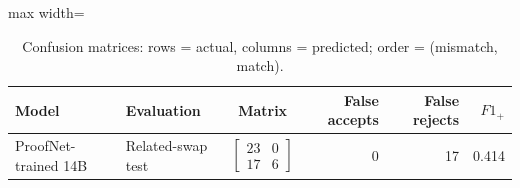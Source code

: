 \begin{table}[htbp]
\centering
\caption{Confusion matrices: rows = actual, columns = predicted; order = (mismatch, match).}
\label{tab:informalization-proofnet-confusion}
\small
\begin{adjustbox}{max width=\textwidth}
\begin{tabular}{llcrrr}
\toprule
Model & Evaluation & Matrix & False accepts & False rejects & $F1_+$ \\
\midrule
ProofNet-trained 14B & Related-swap test & $\left[\begin{array}{rr}23&0\\17&6\end{array}\right]$ & 0 & 17 & 0.414 \\
\bottomrule
\end{tabular}
\end{adjustbox}
\end{table}
